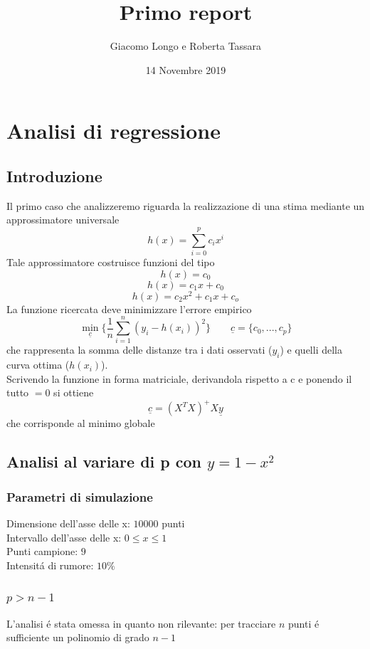 \documentclass[12pt]{article}
\title{Primo report}
\author{Giacomo Longo e Roberta Tassara}
\date{14 Novembre 2019}
\begin{document}
\begin{titlepage}
\maketitle
\end{titlepage}

\section{Analisi di regressione}
\subsection{Introduzione}
Il primo caso che analizzeremo riguarda la realizzazione di una stima mediante un approssimatore universale
$$
  h(x) = \sum_{i=0}^{p} c_i x^i
$$
Tale approssimatore costruisce funzioni del tipo
$$
  h(x) = c_0
$$
$$
  h(x) = c_1 x + c_0
$$
$$
  h(x) = c_2 x^2 + c_1 x + c_o
$$
La funzione ricercata deve minimizzare l'errore empirico
$$
  \underset{\underline{c}}{\min} \{ \frac{1}{n} \sum_{i=1}^{n} (y_i - h(x_i))^2 \}
  \qquad
  \underline{c} = \{ c_0, ..., c_p \}
$$
che rappresenta la somma delle distanze tra i dati osservati ($y_i$) e quelli della curva ottima ($h(x_i)$). \\
Scrivendo la funzione in forma matriciale,
derivandola rispetto a c
e ponendo il tutto $=0$ si ottiene
$$
  \underline{c} = (X^T X)^+ X \underline{y}
$$
che corrisponde al minimo globale

\subsection{Analisi al variare di p con $y=1-x^2$}

\subsubsection{Parametri di simulazione}
Dimensione dell'asse delle x: $10000$ punti \\
Intervallo dell'asse delle x: $0 \leq x \leq 1$ \\
Punti campione: $9$ \\
Intensitá di rumore: $10\%$

\subsubsection{$p>n-1$}
L'analisi é stata omessa in quanto non rilevante: per tracciare $n$ punti é sufficiente un polinomio di grado $n-1$
\end{document}
